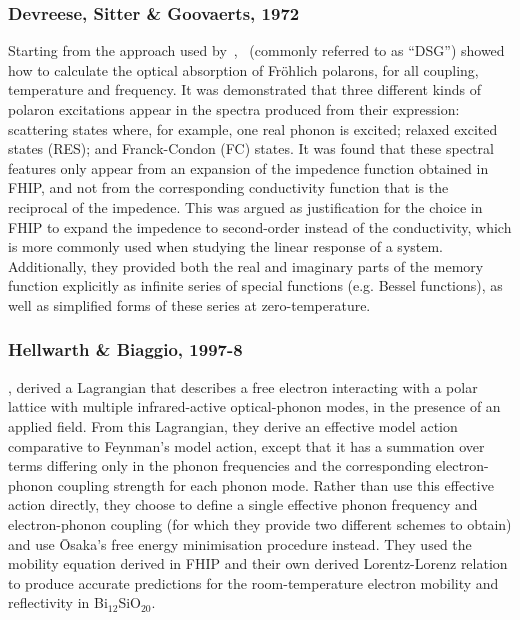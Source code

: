 \subsubsection{Devreese, Sitter \& Goovaerts, 1972}
\label{subsubsec:2-1-1-6}

Starting from the approach used by~\cite{feynman_mobility_1962},~\cite{devreese_optical_1972} (commonly referred to as ``DSG'') showed how to calculate the optical absorption of Fr\"ohlich polarons, for all coupling, temperature and frequency. It was demonstrated that three different kinds of polaron excitations appear in the spectra produced from their expression: scattering states where, for example, one real phonon is excited; relaxed excited states (RES); and Franck-Condon (FC) states. It was found that these spectral features only appear from an expansion of the impedence function obtained in FHIP, and not from the corresponding conductivity function that is the reciprocal of the impedence. This was argued as justification for the choice in FHIP to expand the impedence to second-order instead of the conductivity, which is more commonly used when studying the linear response of a system. Additionally, they provided both the real and imaginary parts of the memory function explicitly as infinite series of special functions (e.g. Bessel functions), as well as simplified forms of these series at zero-temperature.

\subsubsection{Hellwarth \& Biaggio, 1997-8}
\label{subsubsec:2-1-1-7}

\cite{hellwarth_mobility_1999}, derived a Lagrangian that describes a free electron interacting with a polar lattice with multiple infrared-active optical-phonon modes, in the presence of an applied field. From this Lagrangian, they derive an effective model action comparative to Feynman's model action, except that it has a summation over terms differing only in the phonon frequencies and the corresponding electron-phonon coupling strength for each phonon mode. Rather than use this effective action directly, they choose to define a single effective phonon frequency and electron-phonon coupling (for which they provide two different schemes to obtain) and use \=Osaka's free energy minimisation procedure instead. They used the mobility equation derived in FHIP and their own derived Lorentz-Lorenz relation to produce accurate predictions for the room-temperature electron mobility and reflectivity in Bi$_{12}$SiO$_{20}$.

